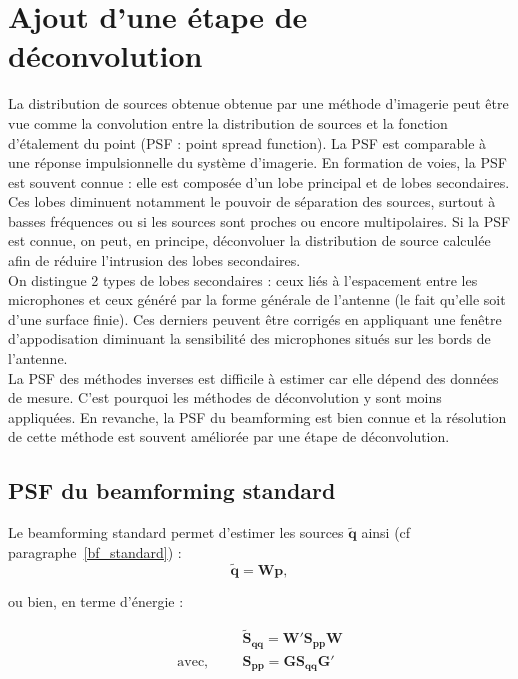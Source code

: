 \section{Ajout d'une étape de déconvolution\label{deconvolution}}

La distribution de sources obtenue obtenue par une méthode d'imagerie peut être vue comme la convolution entre la distribution de sources et la fonction d'étalement du point (PSF : point spread function). La PSF est comparable à une réponse impulsionnelle du système d'imagerie. En formation de voies, la PSF est souvent connue \citep{Bahr2011a}: elle est composée d'un lobe principal et de lobes secondaires. \\

Ces lobes diminuent notamment le pouvoir de séparation des sources, surtout à basses fréquences ou si les sources sont proches ou encore multipolaires. Si la PSF est connue, on peut, en principe, déconvoluer la distribution  de source calculée afin de réduire l'intrusion des lobes secondaires.\\

On distingue 2 types de lobes secondaires : ceux liés à l'espacement entre les microphones et ceux généré par la forme générale de l'antenne (le fait qu'elle soit d'une surface finie). Ces derniers peuvent être corrigés en appliquant une fenêtre d'appodisation diminuant la sensibilité des microphones situés sur les bords de l'antenne.\\


La PSF des méthodes inverses est difficile à estimer car elle dépend des données de mesure. C'est pourquoi les méthodes de déconvolution y sont moins appliquées. En revanche, la PSF du beamforming est bien connue et la résolution de cette méthode est souvent améliorée par une étape de déconvolution.\\

\subsection{PSF du beamforming standard}

Le beamforming standard permet d'estimer les sources $\bm{\tilde{q}}$ ainsi (cf paragraphe~\ref{bf_standard}) : 
\begin{equation}
	\bm{\tilde{q}} = \bm{W}\bm{p},
\end{equation}

ou bien, en terme d'énergie : 

\begin{align}\label{bf_psf}
	~ & \bm{\tilde{S}_{qq}} = \bm{W}' \bm{S_{pp}} \bm{W}  \\
	\text{avec, ~~~~} & \bm{S_{pp}} = \bm{G S_{qq}G}'
\end{align}

